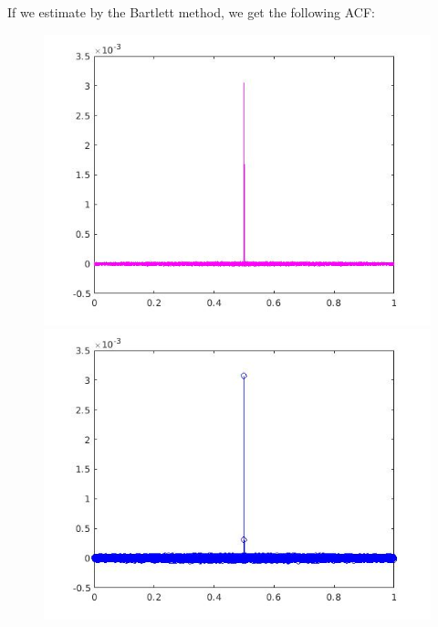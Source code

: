 \documentclass[a4paper,11pt]{article}
\begin{document}
If we estimate by the Bartlett method, we get the following ACF:

\begin{figure}[!hp]
\centering
\begin{minipage}{.5\textwidth}
  \centering
  \includegraphics[width=1\linewidth]{images/lab1_18.jpg}
\end{minipage}%
\begin{minipage}{.5\textwidth}
  \centering
  \includegraphics[width=1\linewidth]{images/lab1_19.jpg}
\end{minipage}
\end{figure}
\end{document}
